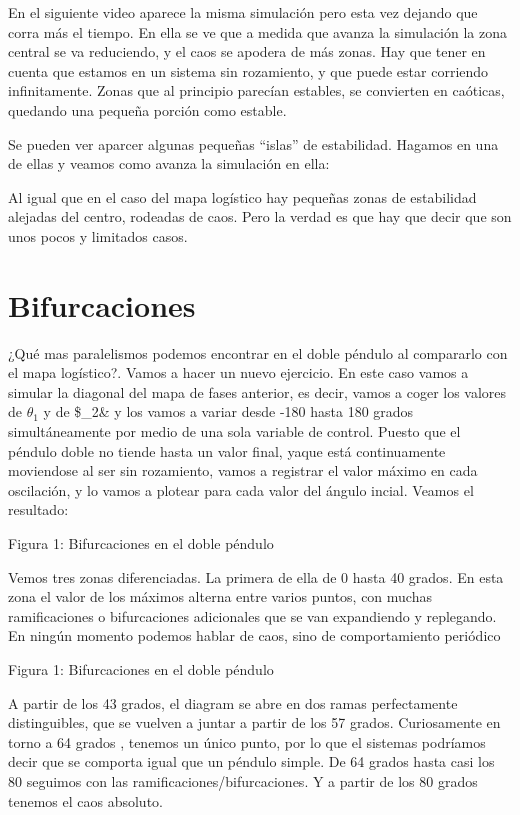 \documentclass[
  10pt,
  a4paper,
  DIV=11,
  numbers=noendperiod,
  open=any]{scrreprt}
\numberwithin{equation}{chapter}
\numberwithin{equation}{chapter}
\renewcommand{\[}{\begin{equation}}
\renewcommand{\]}{\end{equation}}
\begin{document}
En el siguiente video aparece la misma simulación pero esta vez dejando
que corra más el tiempo. En ella se ve que a medida que avanza la
simulación la zona central se va reduciendo, y el caos se apodera de más
zonas. Hay que tener en cuenta que estamos en un sistema sin rozamiento,
y que puede estar corriendo infinitamente. Zonas que al principio
parecían estables, se convierten en caóticas, quedando una pequeña
porción como estable.

Se pueden ver aparcer algunas pequeñas ``islas'' de estabilidad. Hagamos
en una de ellas y veamos como avanza la simulación en ella:

Al igual que en el caso del mapa logístico hay pequeñas zonas de
estabilidad alejadas del centro, rodeadas de caos. Pero la verdad es que
hay que decir que son unos pocos y limitados casos.


\chapter{Bifurcaciones}\label{bifurcaciones}

¿Qué mas paralelismos podemos encontrar en el doble péndulo al
compararlo con el mapa logístico?. Vamos a hacer un nuevo ejercicio. En
este caso vamos a simular la diagonal del mapa de fases anterior, es
decir, vamos a coger los valores de \(\theta_1\) y de \$\theta\_2\& y
los vamos a variar desde -180 hasta 180 grados simultáneamente por medio
de una sola variable de control. Puesto que el péndulo doble no tiende
hasta un valor final, yaque está continuamente moviendose al ser sin
rozamiento, vamos a registrar el valor máximo en cada oscilación, y lo
vamos a plotear para cada valor del ángulo incial. Veamos el resultado:

Figura 1: Bifurcaciones en el doble péndulo

Vemos tres zonas diferenciadas. La primera de ella de 0 hasta 40 grados.
En esta zona el valor de los máximos alterna entre varios puntos, con
muchas ramificaciones o bifurcaciones adicionales que se van expandiendo
y replegando. En ningún momento podemos hablar de caos, sino de
comportamiento periódico

Figura 1: Bifurcaciones en el doble péndulo

A partir de los 43 grados, el diagram se abre en dos ramas perfectamente
distinguibles, que se vuelven a juntar a partir de los 57 grados.
Curiosamente en torno a 64 grados , tenemos un único punto, por lo que
el sistemas podríamos decir que se comporta igual que un péndulo simple.
De 64 grados hasta casi los 80 seguimos con las
ramificaciones/bifurcaciones. Y a partir de los 80 grados tenemos el
caos absoluto.
\end{document}
